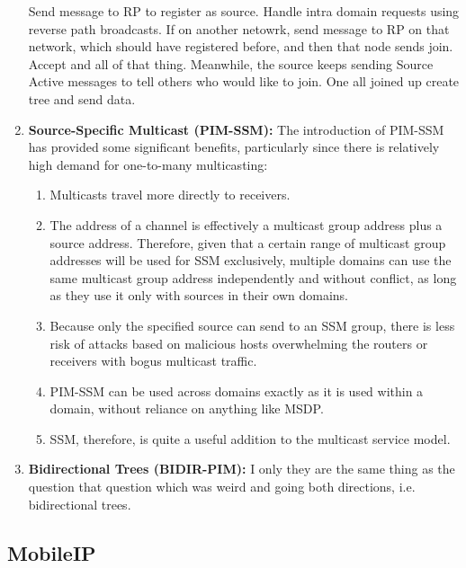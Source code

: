 \documentclass[11pt, a4paper]{article}
\begin{document}
\begin{enumerate}
    Send message to RP to register as source. Handle intra domain requests using reverse path broadcasts. If on another netowrk, send message to RP on that network, which should have registered before, and then that node sends join. Accept and all of that thing. Meanwhile, the source keeps sending Source Active messages to tell others who would like to join. One all joined up create tree and send data.
    \item \textbf{Source-Specific Multicast (PIM-SSM):} 
    The introduction of PIM-SSM has provided some significant benefits, particularly since there is relatively high demand for one-to-many multicasting:
    \begin{enumerate}
    \item Multicasts travel more directly to receivers.
    \item The address of a channel is effectively a multicast group address plus a source address. Therefore, given that a certain range of multicast group addresses will be used for SSM exclusively, multiple domains can use the same multicast group address independently and without conflict, as long as they use it only with sources in their own domains.
    \item Because only the specified source can send to an SSM group, there is less risk of attacks based on malicious hosts overwhelming the routers or receivers with bogus multicast traffic.
    \item PIM-SSM can be used across domains exactly as it is used within a domain, without reliance on anything like MSDP.
    \item SSM, therefore, is quite a useful addition to the multicast service model.
    \end{enumerate}
    \item \textbf{Bidirectional Trees (BIDIR-PIM): } I only they are the same thing as the question that question which was weird and going both directions, i.e. bidirectional trees.
    
\end{enumerate}

\subsection{MobileIP}
\end{document}
